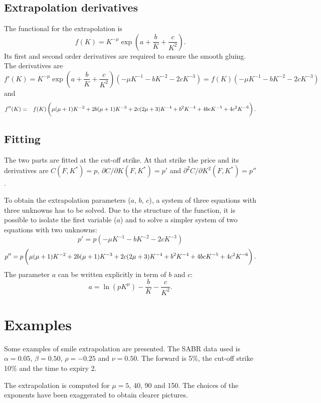 \documentclass[]{amsart}
\begin{document}
\subsection{Extrapolation derivatives}
The functional for the extrapolation is
\[
f(K) = K^{-\mu} \exp\left( a + \frac{b}{K} + \frac{c}{K^2} \right).
\]
Its first and second order derivatives are required to ensure the smooth gluing. The derivatives are
\[
f'(K) = K^{-\mu} \exp\left( a + \frac{b}{K} + \frac{c}{K^2} \right) (-\mu K^{-1} - bK^{-2}-2cK^{-3}) = f(K)(-\mu K^{-1} - bK^{-2}-2cK^{-3})
\]
and
\begin{eqnarray*}
f''(K) & = & f(K) \left(\vphantom{\int} \mu(\mu+1)K^{-2}+2b(\mu+1)K^{-3}+2c(2\mu+3)K^{-4} + b^2 K^{-4} + 4bc K^{-5} + 4 c^2K^{-6} \right).
\end{eqnarray*}

\subsection{Fitting}

The two parts are fitted at the cut-off strike. At that strike the price and its derivatives are $C(F, K^*) = p$, $\partial C/\partial K(F, K^*) = p'$ and $\partial^2 C/\partial K^2(F, K^*) = p''$.

To obtain the extrapolation parameters ($a$, $b$, $c$), a system of three equations with three unknowns has to be solved. Due to the structure of the function, it is possible to isolate the first variable ($a$) and to solve a simpler system of two equations with two unknowns:
\[
p' = p\left(-\mu K^{-1} - bK^{-2}-2cK^{-3}\right)
\]
\[
p'' = p \left(\vphantom{\int} \mu(\mu+1)K^{-2}+2b(\mu+1)K^{-3}+2c(2\mu+3)K^{-4} + b^2 K^{-4} + 4bc K^{-5} + 4 c^2K^{-6} \right).
\]
The parameter $a$ can be written explicitly in term of $b$ and $c$:
\[
a = \ln(p K^{\mu}) - \frac{b}{K} - \frac{c}{K^2}.
\]

\section{Examples}

Some examples of smile extrapolation are presented. The SABR data used is $\alpha=0.05$, $\beta=0.50$, $\rho=-0.25$ and $\nu=0.50$. The forward is 5\%, the cut-off strike 10\% and the time to expiry 2. 

The extrapolation is computed for $\mu=5$, 40, 90 and 150. The choices of the exponents have been exaggerated to obtain clearer pictures.

\end{document}
